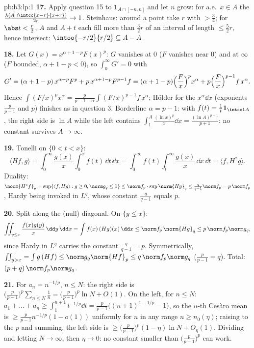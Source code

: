 \begin{solution}{pb:b3:lp:1}
\textbf{17.} Apply question 15 to $\mathbf 1_{A\cap[-n,n]}$
and let $n$ grow: for a.e.\ $x \in A$ the 
$\frac{\lambda(A\cap\intcc{x-r}{x+r})}{2r} \to 1$. Steinhaus:
around a  point take $r$ with  $> \frac34$;
for $\abs t < \frac r2$, $A$ and $A + t$ each fill more than
$\frac32r$ of an interval of length $\leq \frac52r$, hence
intersect: $\intoo{-r/2}{r/2} \subseteq A - A$.

\textbf{18.} Let $G(x) = x^{\alpha+1-p}F(x)^p$: $G$ vanishes
at $0$ ($F$ vanishes near $0$) and at $\infty$ ($F$ bounded,
$\alpha + 1 - p < 0$), so $\int_0^\infty G' = 0$ with
\[
G' = (\alpha + 1 - p)\,x^{\alpha-p}F^p +
p\,x^{\alpha+1-p}F^{p-1}f
= (\alpha + 1 - p)\Bigl(\frac Fx\Bigr)^px^\alpha +
p\Bigl(\frac Fx\Bigr)^{p-1}f\,x^\alpha .
\]
Hence $\int(F/x)^px^\alpha = \frac{p}{p-1-\alpha}
\int(F/x)^{p-1}f\,x^\alpha$; H\"older for the 
$x^\alpha\dd x$ (exponents $\frac p{p-1}$ and $p$) finishes
as in question 3. Borderline $\alpha = p - 1$: with $f(t) =
\frac1t\mathbf 1_{\intcc1A}$, the right side is $\ln A$
while the left contains $\int_1^A\frac{(\ln x)^p}x\dd x =
\frac{(\ln A)^{p+1}}{p+1}$: no constant survives $A \to
\infty$.

\textbf{19.} Tonelli on $\{0 < t < x\}$:
\[
\langle Hf, g\rangle =
\int_0^\infty\frac{g(x)}x\int_0^xf(t)\,\dd t\,\dd x
= \int_0^\infty f(t)\int_t^\infty\frac{g(x)}x\,\dd x\,\dd t
= \langle f, H^*g\rangle .
\]
Duality: $\norm{H^*f}_p = \sup\{\langle f, Hg\rangle : g
\geq 0, \norm g_q \leq 1\} \leq \norm f_p\cdot
\sup\norm{Hg}_q \leq \frac q{q-1}\norm f_p = p\,\norm f_p$,
Hardy being invoked in $L^q$, whose constant $\frac q{q-1}$
equals $p$.

\textbf{20.} Split along the (null) diagonal. On $\{y \leq
x\}$:
\[
\iint_{y\leq x}\frac{f(x)g(y)}{x}\,\dd y\,\dd x
= \int f(x)\,(Hg)(x)\,\dd x \leq \norm f_p\,\norm{Hg}_q
\leq p\,\norm f_p\norm g_q,
\]
since Hardy in $L^q$ carries the constant $\frac q{q-1} =
p$. Symmetrically, $\iint_{y>x} = \int g\,(Hf) \leq
\norm g_q\norm{Hf}_p \leq q\,\norm f_p\norm g_q$ ($\frac
p{p-1} = q$). Total: $(p + q)\,\norm f_p\norm g_q$.

\textbf{21.} For $a_n = n^{-1/p}$, $n \leq N$: the right
side is $\bigl(\frac p{p-1}\bigr)^p\sum_{n\leq N}\frac1n =
\bigl(\frac p{p-1}\bigr)^p\ln N + O(1)$. On the left, for $n
\leq N$: $a_1 + \dots + a_n \geq \int_1^{n+1}t^{-1/p}\dd t =
\frac{p}{p-1}\bigl((n+1)^{1-1/p} - 1\bigr)$, so the $n$-th
Ces\`aro mean is $\geq \frac p{p-1}n^{-1/p}(1 -
o(1))$ uniformly for $n$ in any range $n \geq n_0(\eta)$;
raising to the $p$ and summing, the left side is $\geq
\bigl(\frac p{p-1}\bigr)^p(1 - \eta)\ln N + O_\eta(1)$.
Dividing and letting $N \to \infty$, then $\eta \to 0$: no
constant smaller than $\bigl(\frac p{p-1}\bigr)^p$ can work.


\end{solution}
